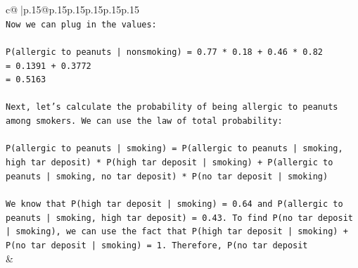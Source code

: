 \documentclass{article}
\begin{document}
{\begin{supertabular}{c@{$\;$}|p{.15\linewidth}@{}p{.15\linewidth}p{.15\linewidth}p{.15\linewidth}p{.15\linewidth}p{.15\linewidth}}
{{{\\ 
\texttt{Now we can plug in the values:} \\
\\ 
\texttt{P(allergic to peanuts | nonsmoking) = 0.77 * 0.18 + 0.46 * 0.82} \\
\texttt{= 0.1391 + 0.3772} \\
\texttt{= 0.5163} \\
\\ 
\texttt{Next, let's calculate the probability of being allergic to peanuts among smokers. We can use the law of total probability:} \\
\\ 
\texttt{P(allergic to peanuts | smoking) = P(allergic to peanuts | smoking, high tar deposit) * P(high tar deposit | smoking) + P(allergic to peanuts | smoking, no tar deposit) * P(no tar deposit | smoking)} \\
\\ 
\texttt{We know that P(high tar deposit | smoking) = 0.64 and P(allergic to peanuts | smoking, high tar deposit) = 0.43. To find P(no tar deposit | smoking), we can use the fact that P(high tar deposit | smoking) + P(no tar deposit | smoking) = 1. Therefore, P(no tar deposit} \\
            }
        }
    }
    & \\ \\


\end{supertabular}}
\end{document}
